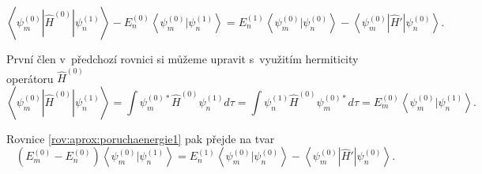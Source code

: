 \begin{equation}
\left < \psi_m^{(0)}|\hat{H}^{(0)}|\psi_n^{(1)} \right >-
E_n^{(0)}\left < \psi_m^{(0)}|\psi_n^{(1)} \right >=
E_n^{(1)}\left < \psi_m^{(0)}|\psi_n^{(0)} \right >-
\left < \psi_m^{(0)}|\hat{H}'|\psi_n^{(0)} \right >.
\label{rov:aprox:poruchaenergie1}
\end{equation}

\noindent První člen v~předchozí rovnici si můžeme upravit s~využitím hermiticity operátoru $\hat{H}^{(0)}$
\begin{equation}
\left < \psi_m^{(0)}|\hat{H}^{(0)}|\psi_n^{(1)} \right >=
\int \psi_m^{(0)*}\hat{H}^{(0)}\psi_n^{(1)}d\tau=
\int \psi_n^{(1)}\hat{H}^{(0)}\psi_m^{(0)*}d\tau=
E_m^{(0)}\left < \psi_m^{(0)}|\psi_n^{(1)} \right >.
\end{equation}

\noindent Rovnice \ref{rov:aprox:poruchaenergie1} pak přejde na tvar
\begin{equation}
\left(E_m^{(0)}-E_n^{(0)}\right)\left < \psi_m^{(0)}|\psi_n^{(1)} \right >=
E_n^{(1)}\left < \psi_m^{(0)}|\psi_n^{(0)} \right >-
\left < \psi_m^{(0)}|\hat{H}'|\psi_n^{(0)} \right >.
\label{rov:aprox:poruchaenergie2}
\end{equation}

